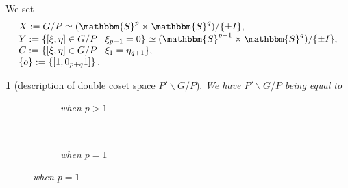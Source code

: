 \documentclass[notes,notheorems]{beamer}
\newcommand{\assign}{:=}
\newtheorem{theorem}{\translate{Theorem}}[section]
\newtheorem{theorem}{\translate{Theorem}}
\theoremstyle{definition}
\theoremstyle{example}
\theoremstyle{plain}
\theoremstyle{mystyle}
\begin{document}
\begin{frame}{}
	We set
	\begin{equation*}
		\begin{array}[]{l}
X \assign G / P \simeq (\mathbbm{S}^p \times
\mathbbm{S}^q) / \{ \pm I \}, \\
Y \assign \{ [\xi, \eta] \in G / P \mid \xi_{p +
1} = 0 \} \simeq (\mathbbm{S}^{p - 1} \times \mathbbm{S}^q) / \{ \pm I \}, \\
C \assign \{ [\xi, \eta] \in G / P \mid \xi_1 =
\eta_{q + 1} \},\\
\left\{ o \right\}:=\left\{ \left[ 1,0_{p+q}1 \right] \right\}.
		\end{array}
	\end{equation*}
	\begin{theorem}[description of double coset space $P'
\backslash G / P$]
We have $P' \backslash G / P$ being equal to
  \begin{figure}[H]
    \centering
    \begin{subfigure}[t]{0.3\textwidth}
	    \xymatrixrowsep{0.5pc}
	\caption{when $p>1$}
    \end{subfigure}
    ~ %
    \begin{subfigure}[t]{0.3\textwidth}
	    \xymatrixrowsep{0.5pc}
	    {}
	    \vspace{0.7em}
	\caption{when $p=1$}
    \end{subfigure}
\vspace{-0.8em}
\end{figure}
	\end{theorem}
\end{frame}
\end{document}
